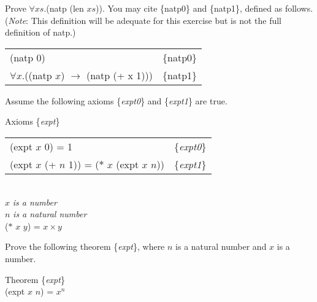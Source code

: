 \begin{ExerciseList}

\Exercise Prove $\forall xs.$(natp (len $xs$)).
You may cite
\{natp0\} and \{natp1\},
defined as follows. (\emph{Note}: This definition will be adequate for this exercise but is not the full definition of natp.)
\begin{center}
\begin{tabular}{ll}
(natp $0$)                                            & \{natp0\}\\
$\forall x.$((natp $x$) $\rightarrow$ (natp (+ x 1))) & \{natp1\}\\
\end{tabular}
\end{center}

\Exercise Assume the following axioms \{\emph{expt0}\} and \{\emph{expt1}\} are true.
\begin{samepage}
\label{expt-equations}
\begin{center}
Axioms \{\emph{expt}\} \\
\begin{tabular}{ll}
(expt $x$ 0) = 1                                & \{\emph{expt0}\} \\
(expt $x$ (+ $n$ 1)) = ($*$ $x$ (expt $x$ $n$)) & \{\emph{expt1}\} \\
\hline
\end{tabular}
\\ $x$ \emph{is a number}
\\ $n$ \emph{is a natural number}
\\ ($*$ $x$ $y$) = $x \times y$
\end{center}
\end{samepage}
Prove the following theorem \{\emph{expt}\}, where $n$ is a natural number and $x$ is a number.
\begin{samepage}
\label{expt-thm}
\begin{center}
Theorem \{\emph{expt}\} \\
(expt $x$ $n$) = $x^n$
\end{center}
\end{samepage}

\end{ExerciseList}

